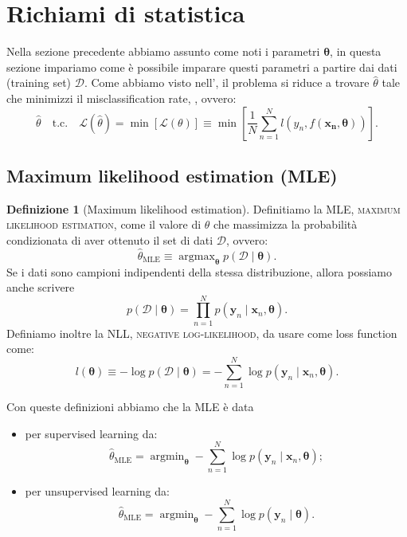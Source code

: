 \documentclass[10pt]{article}
\DeclareMathOperator*{\argmax}{argmax}
\DeclareMathOperator*{\argmin}{argmin}
\renewcommand{\vec}[1]{\boldsymbol{#1}}
\newcommand{\im}[1]{\textsc{#1}}
\newcommand{\cond}{\mid}
\newcommand{\pare}[1]{
	\ensuremath{\left(#1\right)}
}
\newcommand{\spare}[1]{
	\ensuremath{\left[#1\right]}
}
\theoremstyle{definition}
\newtheorem{definition}{Definizione}[section]
\begin{document}
\section{Richiami di statistica}
Nella sezione precedente abbiamo assunto come noti i parametri $\vec{\theta}$, in questa sezione impariamo come è possibile imparare questi parametri a partire dai dati (training set) $\mathcal{D}$. Come abbiamo visto nell', il problema si riduce a trovare $\hat{\theta}$ tale che minimizzi il misclassification rate, , ovvero:
\[
\hat{\theta} \quad\text{t.c.}\quad \mathcal{L}(\hat{\theta}) = \min\spare{\mathcal{L}\pare{\theta}} \equiv \min\spare{\frac{1}{N}\sum_{n=1}^N l\pare{y_n, f\pare{\vec{x_n}, \vec{\theta}}}}.
\]

\subsection{Maximum likelihood estimation (MLE)}
\begin{definition}[Maximum likelihood estimation]
Definitiamo la MLE, \im{maximum likelihood estimation}, come il valore di $\theta$ che massimizza la probabilità condizionata di aver ottenuto il set di dati $\mathcal{D}$, ovvero:
\begin{equation}
\hat{\theta}_{\text{MLE}} \equiv \argmax_{\vec{\theta}} p\pare{\mathcal{D}\cond\vec{\theta}}.
\end{equation}
Se i dati sono campioni indipendenti della stessa distribuzione, allora possiamo anche scrivere
\begin{equation}
p\pare{\mathcal{D}\cond\vec{\theta}} = \prod_{n=1}^N p\pare{\vec{y}_n \cond \vec{x}_n, \vec{\theta}}.
\end{equation}
Definiamo inoltre la NLL, \textsc{negative log-likelihood}, da usare come loss function come:
\begin{equation}
l\pare{\vec{\theta}} \equiv -\log p\pare{\mathcal{D}\cond\vec{\theta}} = -\sum_{n=1}^N \log p\pare{\vec{y}_n \cond \vec{x}_n , \vec{\theta}}.
\end{equation}
\end{definition}

Con queste definizioni abbiamo che la MLE è data
\begin{itemize}
\item per supervised learning da:
\begin{equation}
\hat{\theta}_{\text{MLE}} = \argmin_{\vec{\theta}} -\sum_{n=1}^N \log p\pare{\vec{y}_n \cond \vec{x}_n, \vec{\theta}};
\end{equation}
\item per unsupervised learning da:
\begin{equation}
\hat{\theta}_{\text{MLE}} = \argmin_{\vec{\theta}} -\sum_{n=1}^N \log p\pare{\vec{y}_n \cond \vec{\theta}}.
\end{equation}
\end{itemize}
\end{document}
